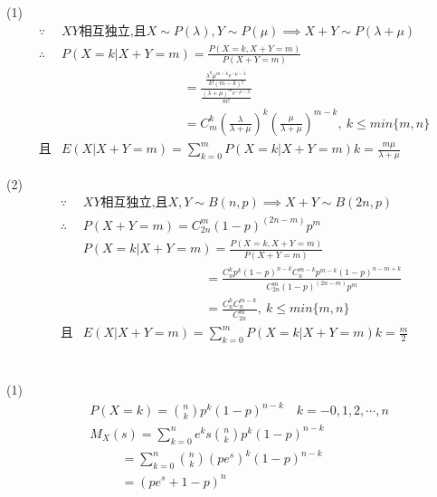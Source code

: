 \documentclass{article}
\begin{document}
(1)
\begin{equation}
    \begin{aligned}
        \because &XY\mbox{相互独立,且}X\sim P(\lambda),Y\sim P(\mu)\implies X+Y\sim P(\lambda+\mu)\\\nonumber
        \therefore&P(X=k|X+Y=m)=\frac{P(X=k,X+Y=m)}{P(X+Y=m)}\\
        &\qquad\qquad\qquad\qquad\quad\ \ \,=\frac{\frac{\lambda^k\mu^{m-k}e^{-\mu-\lambda}}{k!(m-k)!}}{\frac{(\lambda+\mu)^me^{-\mu-\lambda}}{m!}}\\
        &\qquad\qquad\qquad\qquad\quad\ \ \,=C_m^k(\frac{\lambda}{\lambda+\mu})^k(\frac{\mu}{\lambda+\mu})^{m-k},\ k\le min\{m,n\}\\
        \mbox{且}&E(X|X+Y=m)=\sum_{k=0}^mP(X=k|X+Y=m)k=\frac{m\mu}{\lambda+\mu}
    \end{aligned}
\end{equation}

(2)
\begin{equation}
    \begin{aligned}
        \because &XY\mbox{相互独立,且}X,Y\sim B(n,p)\implies X+Y\sim B(2n,p)\\\nonumber
        \therefore &P(X+Y=m)=C_{2n}^m(1-p)^{(2n-m)}p^{m}\\
        &P(X=k|X+Y=m)=\frac{P(X=k,X+Y=m)}{P(X+Y=m)}\\
        &\qquad\qquad\qquad\qquad\quad\ \ \,=\frac{C_n^kp^k(1-p)^{n-k}C_n^{m-k}p^{m-k}(1-p)^{n-m+k}}
        {C_{2n}^m(1-p)^{(2n-m)}p^{m}}\\
        &\qquad\qquad\qquad\qquad\quad\ \ \,=\frac{C_n^kC_n^{m-k}}{C_{2n}^m},\ k\le min\{m,n\}\\
        \mbox{且}&E(X|X+Y=m)=\sum_{k=0}^mP(X=k|X+Y=m)k=\frac{m}{2}
    \end{aligned}
\end{equation}

\section{ }

(1)
\begin{equation}
    \begin{aligned}
        &P(X=k)=\binom{n}{k}p^k(1-p)^{n-k}\quad k=-0,1,2,\cdots,n\\\nonumber
        &M_X(s)=\sum_{k=0}^ne^ks\binom{n}{k}p^k(1-p)^{n-k}\\
        &\qquad\ \ =\sum_{k=0}^n\binom{n}{k}(pe^s)^k(1-p)^{n-k}\\
        &\qquad\ \ =(pe^s+1-p)^n
    \end{aligned}
\end{equation}
\end{document}

